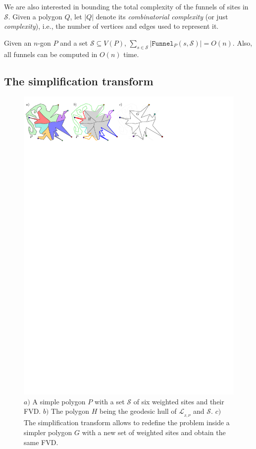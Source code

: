 \documentclass[a4paper,UKenglish]{socg-lipics-v2018}
\newcommand{\s}{\mathcal S}
\newcommand{\funnel}[2][P]{\ensuremath{\mathtt{Funnel}_{\scriptscriptstyle #1}(#2)}}
\newcommand{\LL}[1][\s, P]{\ensuremath{\mathcal L_{_{#1}}}}
\begin{document}
We are also interested in bounding the total complexity of the funnels of sites in $\s$.
Given a polygon $Q$, let $|Q|$ denote its \emph{combinatorial complexity} (or just \emph{complexity}), i.e., the number of vertices and edges used to represent it. 

\begin{lemma}\label{lemma:Complexity of funnels}
Given an $n$-gon $P$ and a set $\s\subseteq V(P)$, $\sum_{s\in \s} |\funnel{s, \s}| = O(n)$.
Also, all funnels can be computed in $O(n)$ time. 
\end{lemma}

\subsection{The simplification transform}\label{section:Simplification}

\begin{figure}[t]
\centering
\includegraphics{imgSimplification.pdf}
\caption{$a)$ A simple polygon $P$ with a set $\s$ of six weighted sites and their FVD. $b)$ The polygon $H$ being the geodesic hull of $\LL$ and $\s$.
$c)$ The simplification transform allows to redefine the problem inside a simpler polygon $G$ with a new set of weighted sites and obtain the same FVD.}
\label{fig:FVD}
\end{figure}
\end{document}
